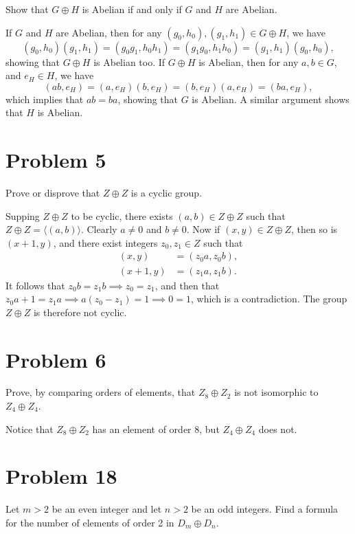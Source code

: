 \documentclass[12pt]{article}
\begin{document}
Show that $G\oplus H$ is Abelian if and only if $G$ and $H$ are Abelian.

If $G$ and $H$ are Abelian, then for any $(g_0,h_0),(g_1,h_1)\in G\oplus H$,
we have
\begin{equation*}
(g_0,h_0)(g_1,h_1)=(g_0g_1,h_0h_1)=(g_1g_0,h_1h_0)=(g_1,h_1)(g_0,h_0),
\end{equation*}
showing that $G\oplus H$ is Abelian too.  If $G\oplus H$ is Abelian, then
for any $a,b\in G$, and $e_H\in H$, we have
\begin{equation*}
(ab,e_H)=(a,e_H)(b,e_H)=(b,e_H)(a,e_H)=(ba,e_H),
\end{equation*}
which implies that $ab=ba$, showing that $G$ is Abelian.
A similar argument shows that $H$ is Abelian.

\section*{Problem 5}

Prove or disprove that $Z\oplus Z$ is a cyclic group.

Supping $Z\oplus Z$ to be cyclic, there exists $(a,b)\in Z\oplus Z$
such that $Z\oplus Z=\langle(a,b)\rangle$.  Clearly $a\neq 0$ and $b\neq 0$.
Now if $(x,y)\in Z\oplus Z$, then so is $(x+1,y)$, and there exist
integers $z_0,z_1\in Z$ such that
\begin{align*}
(x,y) &= (z_0a,z_0b), \\
(x+1,y) &= (z_1a,z_1b).
\end{align*}
It follows that $z_0b=z_1b\implies z_0=z_1$, and then that
$z_0a+1=z_1a\implies a(z_0-z_1)=1\implies 0=1$,
which is a contradiction.  The group $Z\oplus Z$ is therefore
not cyclic.

\section*{Problem 6}

Prove, by comparing orders of elements, that $Z_8\oplus Z_2$ is
not isomorphic to $Z_4\oplus Z_4$.

Notice that $Z_8\oplus Z_2$ has an element of order 8,
but $Z_4\oplus Z_4$ does not.

\section*{Problem 18}

Let $m>2$ be an even integer and let $n>2$ be an odd integers.
Find a formula for the number of elements of order 2 in $D_m\oplus D_n$.
\end{document}
